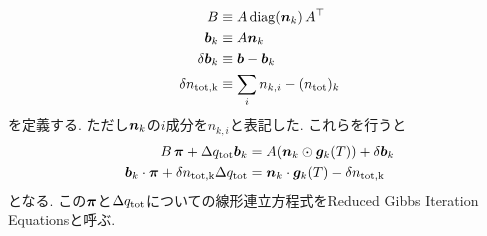 \begin{align}
    B &\equiv  A \, \mathrm{diag} (\boldsymbol{n}_k) \, A^\top \\
    \boldsymbol{b}_k &\equiv A \boldsymbol{n}_k \\
    \delta \boldsymbol{b}_k &\equiv \boldsymbol{b} - \boldsymbol{b}_k \\
     \delta n_\mathrm{tot,k} &\equiv  \sum_i n_{k,i} - (n_\mathrm{tot})_{k}
\end{align}
を定義する. ただし$\boldsymbol{n}_k$の$i$成分を$n_{k,i}$と表記した. これらを行うと
\begin{align}
\label{eq:rgie1}
   B \, \boldsymbol{\pi} + \Delta q_\mathrm{tot} \boldsymbol{b}_k &= A ( \boldsymbol{n}_k \odot \boldsymbol{g}_k (T) ) + \delta \boldsymbol{b}_k \\
\label{eq:rgie2}
\boldsymbol{b}_k \cdot \boldsymbol{\pi} + \delta n_\mathrm{tot, k} \Delta q_\mathrm{tot} &= \boldsymbol{n}_k \cdot \boldsymbol{g}_k(T) - \delta n_\mathrm{tot,k}
\end{align}
となる. この$\boldsymbol{\pi}$と$\Delta q_\mathrm{tot}$についての線形連立方程式をReduced Gibbs Iteration Equationsと呼ぶ. 
